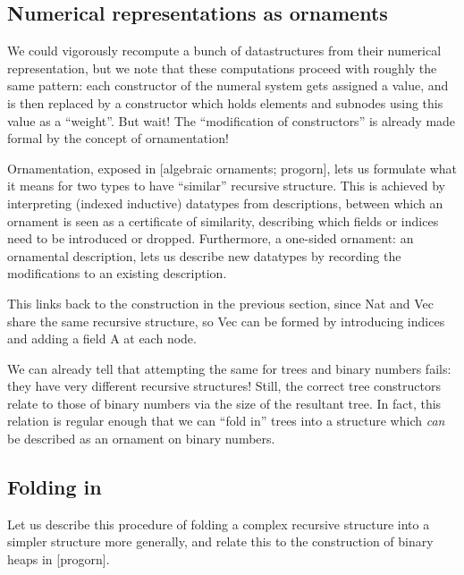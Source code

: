 \documentclass[Main.tex]{subfiles}
\begin{document}
\subsection{Numerical representations as ornaments}
We could vigorously recompute a bunch of datastructures from their numerical representation, but we note that these computations proceed with roughly the same pattern: each constructor of the numeral system gets assigned a value, and is then replaced by a constructor which holds elements and subnodes using this value as a ``weight''. But wait! The ``modification of constructors'' is already made formal by the concept of ornamentation!

Ornamentation, exposed in [algebraic ornaments; progorn], lets us formulate what it means for two types to have ``similar'' recursive structure. This is achieved by interpreting (indexed inductive) datatypes from descriptions, between which an ornament is seen as a certificate of similarity, describing which fields or indices need to be introduced or dropped. Furthermore, a one-sided ornament: an ornamental description, lets us describe new datatypes by recording the modifications to an existing description.

This links back to the construction in the previous section, since Nat and Vec share the same recursive structure, so Vec can be formed by introducing indices and adding a field A at each node.
\begin{code}

\end{code}
We can already tell that attempting the same for trees and binary numbers fails: they have very different recursive structures! Still, the correct tree constructors relate to those of binary numbers via the size of the resultant tree. In fact, this relation is regular enough that we can ``fold in'' trees into a structure which \textit{can} be described as an ornament on binary numbers.


\subsection{Folding in}
Let us describe this procedure of folding a complex recursive structure into a simpler structure more generally, and relate this to the construction of binary heaps in [progorn].
\end{document}
